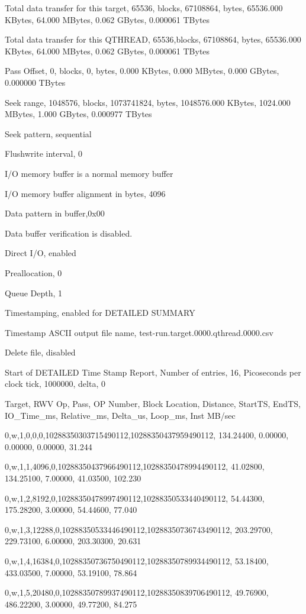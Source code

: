 Total data transfer for this target, 65536, blocks, 67108864, bytes, 65536.000 KBytes, 64.000 MBytes, 0.062 GBytes, 0.000061 TBytes

Total data transfer for this QTHREAD, 65536,blocks, 67108864, bytes, 65536.000 KBytes, 64.000 MBytes, 0.062 GBytes, 0.000061 TBytes

Pass Offset, 0, blocks, 0, bytes, 0.000 KBytes, 0.000 MBytes, 0.000 GBytes, 0.000000 TBytes

Seek range, 1048576, blocks, 1073741824, bytes, 1048576.000 KBytes, 1024.000 MBytes, 1.000 GBytes, 0.000977 TBytes

Seek pattern, sequential

Flushwrite interval, 0

I/O memory buffer is a normal memory buffer

I/O memory buffer alignment in bytes, 4096

Data pattern in buffer,0x00

Data buffer verification is disabled.

Direct I/O, enabled

Preallocation, 0

Queue Depth, 1

Timestamping, enabled for DETAILED SUMMARY

Timestamp ASCII output file name, test-run.target.0000.qthread.0000.csv

Delete file, disabled

Start of DETAILED Time Stamp Report, Number of entries, 16, Picoseconds per clock tick, 1000000, delta, 0

Target, RWV Op, Pass, OP Number, Block Location, Distance, StartTS, EndTS, IO\_Time\_ms, Relative\_ms, Delta\_us, Loop\_ms, Inst MB/sec

0,w,1,0,0,0,10288350303715490112,10288350437959490112, 134.24400, 0.00000, 0.00000, 0.00000, 31.244

0,w,1,1,4096,0,10288350437966490112,10288350478994490112, 41.02800, 134.25100, 7.00000, 41.03500, 102.230

0,w,1,2,8192,0,10288350478997490112,10288350533440490112, 54.44300, 175.28200, 3.00000, 54.44600, 77.040

0,w,1,3,12288,0,10288350533446490112,10288350736743490112, 203.29700, 229.73100, 6.00000, 203.30300, 20.631

0,w,1,4,16384,0,10288350736750490112,10288350789934490112, 53.18400, 433.03500, 7.00000, 53.19100, 78.864

0,w,1,5,20480,0,10288350789937490112,10288350839706490112, 49.76900, 486.22200, 3.00000, 49.77200, 84.275


